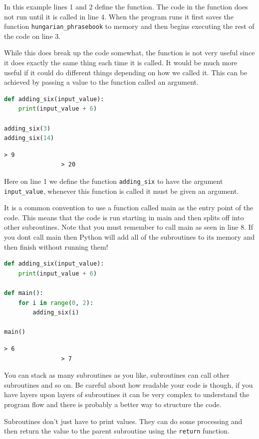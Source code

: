 In this example lines 1 and 2 define the function. The code in the function does not run until it is called in line 4. When the program runs it first saves the function \texttt{hungarian\_phrasebook} to memory and then begins executing the rest of the code on line 3. 

While this does break up the code somewhat, the function is not very useful since it does exactly the same thing each time it is called. It would be much more useful if it could do different things depending on how we called it. This can be achieved by passing a value to the function called an argument.

			\begin{lstlisting}[language=Python]
def adding_six(input_value):
	print(input_value + 6)

adding_six(3)
adding_six(14)\end{lstlisting}
			\begin{verbatim}> 9
				> 20\end{verbatim}

				Here on line 1 we define the function \texttt{adding\_six} to have the argument \texttt{input\_value}, whenever this function is called it must be given an argument. 

It is a common convention to use a function called main as the entry point of the code. This means that the code is run starting in main and then splits off into other subroutines. Note that you must remember to call main as seen in line 8. If you dont call main then Python will add all of the subroutines to its memory and then finish without running them!
				
			\begin{lstlisting}[language=Python]
def adding_six(input_value):
	print(input_value + 6)

def main():
	for i in range(0, 2):
		adding_six(i)
		
main()\end{lstlisting}
			\begin{verbatim}> 6
				> 7\end{verbatim}
				
				You can stack as many subroutines as you like, subroutines can call other subroutines and so on. Be careful about how readable your code is though, if you have layers upon layers of subroutines it can be very complex to understand the program flow and there is probably a better way to structure the code. 

				Subroutines don't just have to print values. They can do some processing and then return the value to the parent subroutine using the \texttt{return} function.

